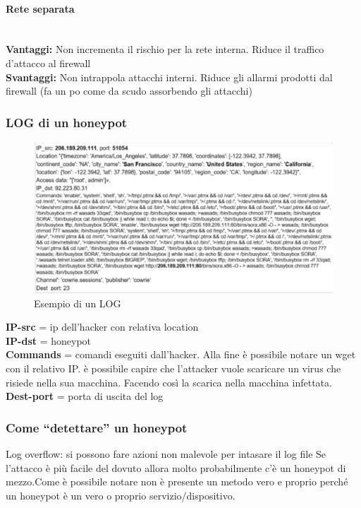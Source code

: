 \documentclass{article}
\begin{document}
\paragraph{Rete separata}
\noindent
\\
\textbf{Vantaggi:} Non incrementa il rischio per la rete interna. Riduce il traffico d’attacco al firewall\\
\textbf{Svantaggi:} Non intrappola attacchi interni. Riduce gli allarmi prodotti dal firewall (fa un po come 
da scudo assorbendo gli attacchi)
\subsubsection{LOG di un honeypot}
\begin{figure}[H]
    \center
    \includegraphics[scale=0.3]{images/HP2.png}
    \caption{Esempio di un LOG}\label{fig:1}
\end{figure}
\textbf{IP-src} = ip dell’hacker con relativa location \\
\textbf{IP-dst} = honeypot\\
\textbf{Commands} = comandi eseguiti dall’hacker. Alla fine è possibile notare un wget con il relativo IP.  
è possibile capire che l’attacker vuole scaricare un virus che risiede nella sua macchina. Facendo così la scarica nella macchina infettata.\\
\textbf{Dest-port} = porta di  uscita del log \\
\subsubsection{Come “detettare” un honeypot}
Log overflow: si possono fare azioni non malevole per intasare il log file
Se l’attacco è più facile del dovuto allora molto probabilmente c’è un honeypot di mezzo.Come è possibile notare non è presente un metodo 
vero e proprio perché un honeypot è un vero o proprio servizio/dispositivo. 
\end{document}
